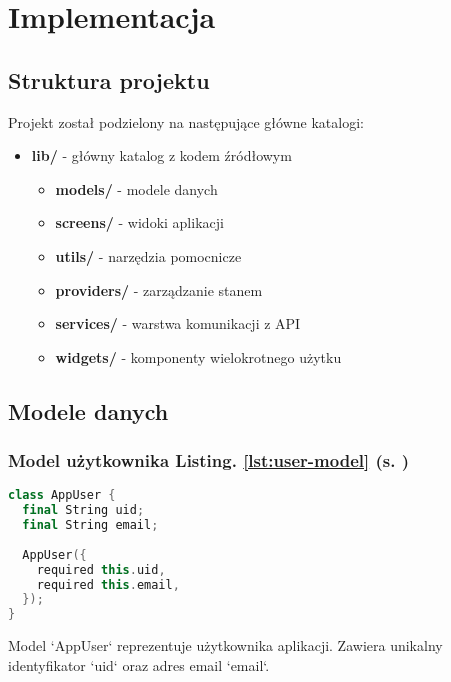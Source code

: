 \newpage
\section{Implementacja}		%

\subsection{Struktura projektu}

Projekt został podzielony na następujące główne katalogi:

\begin{itemize}
  \item \textbf{lib/} - główny katalog z kodem źródłowym
        \begin{itemize}
          \item \textbf{models/} - modele danych
          \item \textbf{screens/} - widoki aplikacji
          \item \textbf{utils/} - narzędzia pomocnicze
          \item \textbf{providers/} - zarządzanie stanem
          \item \textbf{services/} - warstwa komunikacji z API
          \item \textbf{widgets/} - komponenty wielokrotnego użytku
        \end{itemize}
\end{itemize}

\subsection{Modele danych}

\subsubsection{Model użytkownika \textbf{Listing. \ref{lst:user-model} (s. \pageref{lst:user-model})}}
\begin{lstlisting}[language=C++, caption=Model użytkownika, label={lst:user-model}]
class AppUser {
  final String uid;
  final String email;
  
  AppUser({
    required this.uid,
    required this.email,
  });
}
\end{lstlisting}
Model `AppUser` reprezentuje użytkownika aplikacji. Zawiera unikalny identyfikator `uid` oraz adres email `email`.
\newpage
